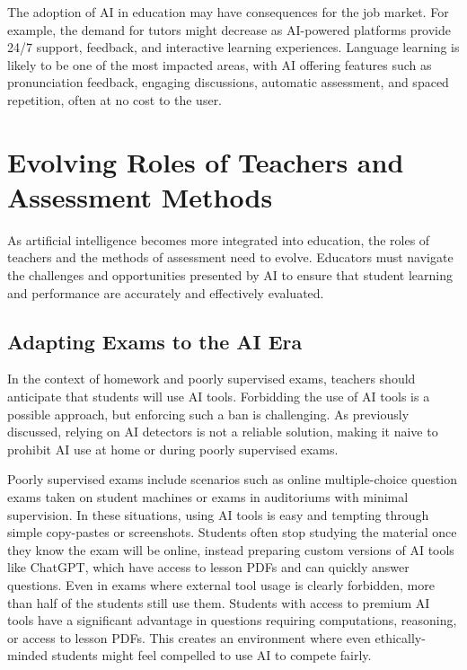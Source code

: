 \documentclass{article}
\begin{document}
The adoption of AI in education may have consequences for the job market.
For example, the demand for tutors might decrease as AI-powered platforms
provide 24/7 support, feedback, and interactive learning experiences.
Language learning is likely to be one of the most impacted areas, with
AI offering features such as pronunciation feedback, engaging discussions,
automatic assessment, and spaced repetition, often at no cost to the user.






\newpage

\section{Evolving Roles of Teachers and Assessment Methods}

As artificial intelligence becomes more integrated into education, the roles of teachers and the methods of assessment need to evolve. Educators must navigate the challenges and opportunities presented by AI to ensure that student learning and performance are accurately and effectively evaluated.

\subsection{Adapting Exams to the AI Era}

In the context of homework and poorly supervised exams, teachers should anticipate that students will use AI tools. Forbidding the use of AI tools is a possible approach, but enforcing such a ban is challenging. As previously discussed, relying on AI detectors is not a reliable solution, making it naive to prohibit AI use at home or during poorly supervised exams.

Poorly supervised exams include scenarios such as online multiple-choice question exams taken on student machines or exams in auditoriums with minimal supervision. In these situations, using AI tools is easy and tempting through simple copy-pastes or screenshots. Students often stop studying the material once they know the exam will be online, instead preparing custom versions of AI tools like ChatGPT, which have access to lesson PDFs and can quickly answer questions. Even in exams where external tool usage is clearly forbidden, more than half of the students still use them. Students with access to premium AI tools have a significant advantage in questions requiring computations, reasoning, or access to lesson PDFs. This creates an environment where even ethically-minded students might feel compelled to use AI to compete fairly.
\end{document}
